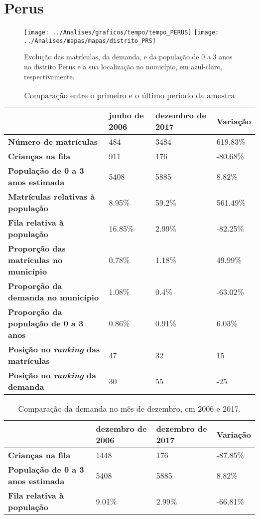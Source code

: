 \section{Perus}
\begin{figure}[H]
\centering
\texttt{[image: ../Analises/graficos/tempo/tempo\_PERUS]}
\texttt{[image: ../Analises/mapas/mapas/distrito\_PRS]}
\caption{Evolução das matrículas, da demanda, e da população de 0 a 3 anos no distrito Perus e a sua localização no município, em azul-claro, respectivamente.}
\end{figure}
\begin{table}[H]
\begin{tabular}{l|l|l|l}
\textbf{}                                      & \textbf{junho de 2006}       & \textbf{dezembro de 2017}    & \textbf{Variação} \\ \hline
\textbf{Número de matrículas}                  & 484 & 3484 & 619.83\% \\ \hline
\textbf{Crianças na fila}                      & 911 & 176 & -80.68\% \\ \hline
\textbf{População de 0 a 3 anos estimada}      & 5408 & 5885 & 8.82\% \\ \hline
\textbf{Matrículas relativas à população}      & 8.95\% & 59.2\% & 561.49\% \\ \hline
\textbf{Fila relativa à população}             & 16.85\% & 2.99\% & -82.25\% \\ \hline
\textbf{Proporção das matrículas no município} & 0.78\% & 1.18\% & 49.99\% \\ \hline
\textbf{Proporção da demanda no município}     & 1.08\% & 0.4\% & -63.02\% \\ \hline
\textbf{Proporção da população de 0 a 3 anos}  & 0.86\% & 0.91\% & 6.03\% \\ \hline
\textbf{Posição no \textit{ranking} das matrículas}     & 47 & 32 & 15 \\ \hline
\textbf{Posição no \textit{ranking} da demanda}         & 30 & 55 & -25 \\ 
\end{tabular}
\caption{Comparação entre o primeiro e o último período da amostra}
\end{table}
\begin{table}[H]
\begin{tabular}{l|l|l|l}
\textbf{}                                 & \textbf{dezembro de 2006} & \textbf{dezembro de 2017} & \textbf{Variação} \\ \hline
\textbf{Crianças na fila}                      & 1448 & 176 & -87.85\% \\ \hline
\textbf{População de 0 a 3 anos estimada}      & 5408 & 5885 & 8.82\% \\ \hline
\textbf{Fila relativa à população}             & 9.01\% & 2.99\% & -66.81\% \\
\end{tabular}
\caption{Comparação da demanda no mês de dezembro, em 2006 e 2017.}
\end{table}
